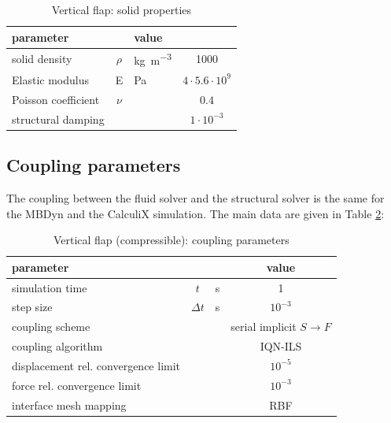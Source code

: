 \begin{table}[!h]
	\begin{center}
		\begin{tabular}{ l c  l | c } 
			parameter & & value &    \\ 
			\hline
			solid density  & $\rho$ & \si{kg.m^{-3}} & 1000    \\
			Elastic modulus  & E & \si{Pa} & $4\cdot 5.6 \cdot 10^9$    \\
			Poisson coefficient & $\nu$ & & $0.4$  \\
			structural damping & & & $1 \cdot 10^{-3}$ \\
		\end{tabular}
	\end{center}
	\caption{Vertical flap: solid properties}
	\label{table:comp-solid}
\end{table}

\subsection{Coupling parameters}

The coupling between the fluid solver and the structural solver is the same for the MBDyn and the CalculiX simulation. The main data are given in Table \ref{table:comp-coupling}:

\begin{table}[!h]
	\begin{center}
		\begin{tabular}{ l c  l| c } 
			parameter & & & value   \\ 
			\hline
			simulation time  & $t$& \si{s} & 1      \\
			step size & $\Delta t$ & \si{s} & $10^{-3}$   \\
			\hline
			coupling scheme & & & serial implicit $S\rightarrow F$  \\
			coupling algorithm & & &  IQN-ILS  \\
			displacement rel. convergence limit & & & $10^{-5}$ \\
			force rel. convergence limit &&  & $10^{-3}$  \\
      		interface mesh mapping & & & RBF  \\
			
		\end{tabular}
	\end{center}
	\caption{Vertical flap (compressible): coupling parameters}
	\label{table:comp-coupling}
\end{table}


